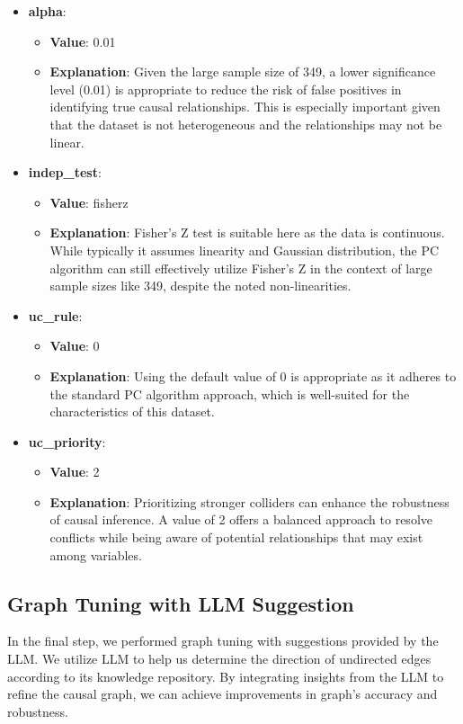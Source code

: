 \documentclass{article}
\begin{document}
\begin{itemize}
    \item \textbf{alpha}:
    \begin{itemize}
        \item \textbf{Value}: 0.01
        \item \textbf{Explanation}: Given the large sample size of 349, a lower significance level (0.01) is appropriate to reduce the risk of false positives in identifying true causal relationships. This is especially important given that the dataset is not heterogeneous and the relationships may not be linear.
    \end{itemize}
    
    \item \textbf{indep\_test}:
    \begin{itemize}
        \item \textbf{Value}: fisherz
        \item \textbf{Explanation}: Fisher's Z test is suitable here as the data is continuous. While typically it assumes linearity and Gaussian distribution, the PC algorithm can still effectively utilize Fisher's Z in the context of large sample sizes like 349, despite the noted non-linearities.
    \end{itemize}
    
    \item \textbf{uc\_rule}:
    \begin{itemize}
        \item \textbf{Value}: 0
        \item \textbf{Explanation}: Using the default value of 0 is appropriate as it adheres to the standard PC algorithm approach, which is well-suited for the characteristics of this dataset.
    \end{itemize}
    
    \item \textbf{uc\_priority}:
    \begin{itemize}
        \item \textbf{Value}: 2
        \item \textbf{Explanation}: Prioritizing stronger colliders can enhance the robustness of causal inference. A value of 2 offers a balanced approach to resolve conflicts while being aware of potential relationships that may exist among variables.
    \end{itemize}
\end{itemize}

\subsection{Graph Tuning with LLM Suggestion}
In the final step, we performed graph tuning with suggestions provided by the LLM. We utilize LLM to help us determine the direction of undirected edges according to its knowledge repository. By integrating insights from the LLM to refine the causal graph, we can achieve improvements in graph's accuracy and robustness.
\end{document}
